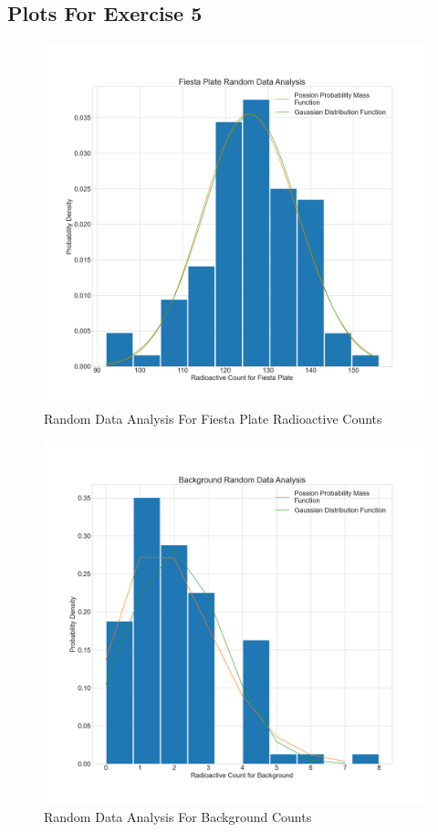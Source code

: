 \documentclass[letterpaper,12pt]{article}
\begin{document}
\pagebreak

\subsection{Plots For Exercise 5}

\begin{figure}[H]
  \centering
  \includegraphics[width=0.95\linewidth]{../Exercise5/Pankaj/Fiesta Plate.png}    
  \caption{Random Data Analysis For Fiesta Plate Radioactive Counts}
  \label{fiesta-plate}
\end{figure}

\begin{figure}[H]
  \centering
  \includegraphics[width=0.95\linewidth]{../Exercise5/Pankaj/Background.png}    
  \caption{Random Data Analysis For Background Counts}
  \label{background}
\end{figure}
\end{document}
